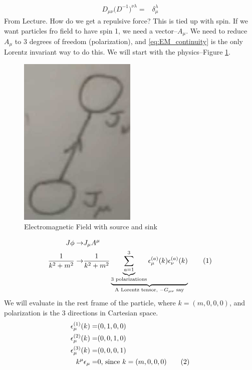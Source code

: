\documentclass[]{article}
\newcommand\numberthis{\addtocounter{equation}{1}\tag{\theequation}}
\begin{document}
\begin{align*}
	D_{\mu\nu} \big(D^{-1}\big)^{\nu\lambda} =& \delta_{\mu}^{\lambda}
\end{align*}
From Lecture. How do we get a repulsive force? This is tied up with spin. If we want particles fro field to have spin 1, we need a vector--$A_{\mu}$. We need to reduce $A_{\mu}$ to 3 degrees of freedom (polarization), and \eqref{eq:EM_continuity} is the only Lorentz invariant way to do this. We will start with the physics--Figure \ref{fig:electromagnetic:current}.
\begin{figure}[H]
	\begin{center}
		\caption{Electromagnetic Field with source and sink}\label{fig:electromagnetic:current}
		\includegraphics[width=0.5\textwidth]{qft_liecture2_1}
	\end{center}
\end{figure}
\begin{align*}
	J \phi \rightarrow& J_{\mu} A^{\mu}\\
	\frac{1}{k^2 + m^2} \rightarrow& \frac{1}{k^2 + m^2} \underbrace{\underbrace{\sum_{a=1}^{3}}_\text{3 polarizations} \epsilon_\mu^{(a)}(k) \epsilon_\nu^{(a)}(k)}_\text{A Lorentz tensor, $-G_{\mu\nu}$ say} \numberthis \label{eq:em:propagator}
\end{align*}
We will evaluate in the rest frame of the particle, where $k=(m,0,0,0)$, and polarization is the 3 directions in Cartesian space.
\begin{align*}
	\epsilon_\mu^{(1)}(k) =& (0,1,0,0)\\
	\epsilon_\mu^{(2)}(k) =& (0,0,1,0)\\
	\epsilon_\mu^{(3)}(k) =& (0,0,0,1)\\
	k^{\mu}\epsilon_\mu =& 0 \text{, since $k=(m,0,0,0)$} \numberthis \label{eq:k_mu_0}
\end{align*}
\end{document}
